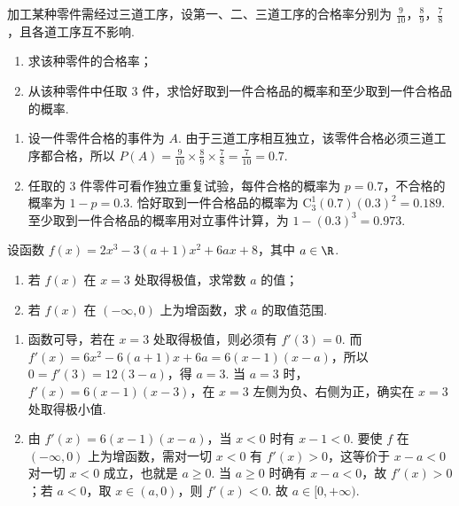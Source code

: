 \begin{problem}
加工某种零件需经过三道工序，设第一、二、三道工序的合格率分别为 \(\frac{9}{10}\)，\(\frac{8}{9}\)，\(\frac{7}{8}\)，且各道工序互不影响.

\begin{enumerate}
\item 求该种零件的合格率；
\item 从该种零件中任取 \(3\) 件，求恰好取到一件合格品的概率和至少取到一件合格品的概率.
\end{enumerate}

\begin{solution}
\begin{enumerate}
\item 设一件零件合格的事件为 \(A\). 由于三道工序相互独立，该零件合格必须三道工序都合格，所以 \(P(A)=\frac9{10}\times\frac89\times\frac78=\frac7{10}=0.7\).
\item 任取的 \(3\) 件零件可看作独立重复试验，每件合格的概率为 \(p=0.7\)，不合格的概率为 \(1-p=0.3\). 恰好取到一件合格品的概率为 \(\mathrm C_3^1(0.7)(0.3)^2=0.189\). 至少取到一件合格品的概率用对立事件计算，为 \(1-(0.3)^3=0.973\).
\end{enumerate}
\end{solution}
\end{problem}

\begin{problem}
设函数 \( f(x) = 2x^{3} - 3(a + 1)x^{2} + 6ax + 8 \)，其中 \( a \in \R \).

\begin{enumerate}
\item 若 \( f(x) \) 在 \( x = 3 \) 处取得极值，求常数 \( a \) 的值；
\item 若 \( f(x) \) 在 \( (-\infty,0) \) 上为增函数，求 \( a \) 的取值范围.
\end{enumerate}

\begin{solution}
\begin{enumerate}
\item 函数可导，若在 \(x=3\) 处取得极值，则必须有 \(f'(3)=0\). 而 \(f'(x)=6x^2-6(a+1)x+6a=6(x-1)(x-a)\)，所以 \(0=f'(3)=12(3-a)\)，得 \(a=3\). 当 \(a=3\) 时，\(f'(x)=6(x-1)(x-3)\)，在 \(x=3\) 左侧为负、右侧为正，确实在 \(x=3\) 处取得极小值.
\item 由 \(f'(x)=6(x-1)(x-a)\)，当 \(x<0\) 时有 \(x-1<0\). 要使 \(f\) 在 \((-\infty,0)\) 上为增函数，需对一切 \(x<0\) 有 \(f'(x)>0\)，这等价于 \(x-a<0\) 对一切 \(x<0\) 成立，也就是 \(a\geqslant0\). 当 \(a\geqslant0\) 时确有 \(x-a<0\)，故 \(f'(x)>0\)；若 \(a<0\)，取 \(x\in(a,0)\)，则 \(f'(x)<0\). 故 \(a\in[0,+\infty)\).
\end{enumerate}
\end{solution}
\end{problem}

